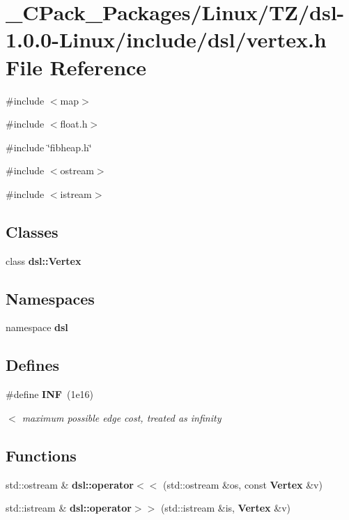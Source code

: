 \section{\_\-CPack\_\-Packages/Linux/TZ/dsl-\/1.0.0-\/Linux/include/dsl/vertex.h File Reference}
\label{__CPack__Packages_2Linux_2TZ_2dsl-1_80_80-Linux_2include_2dsl_2vertex_8h}
{\ttfamily \#include $<$map$>$}\par
{\ttfamily \#include $<$float.h$>$}\par
{\ttfamily \#include \char`\"{}fibheap.h\char`\"{}}\par
{\ttfamily \#include $<$ostream$>$}\par
{\ttfamily \#include $<$istream$>$}\par
\subsection*{Classes}
\begin{DoxyCompactItemize}
\item 
class {\bf dsl::Vertex}
\end{DoxyCompactItemize}
\subsection*{Namespaces}
\begin{DoxyCompactItemize}
\item 
namespace {\bf dsl}
\end{DoxyCompactItemize}
\subsection*{Defines}
\begin{DoxyCompactItemize}
\item 
\#define {\bf INF}~(1e16)
\begin{DoxyCompactList}\small\item\em $<$ maximum possible edge cost, treated as infinity \item\end{DoxyCompactList}\end{DoxyCompactItemize}
\subsection*{Functions}
\begin{DoxyCompactItemize}
\item 
std::ostream \& {\bf dsl::operator$<$$<$} (std::ostream \&os, const {\bf Vertex} \&v)
\item 
std::istream \& {\bf dsl::operator$>$$>$} (std::istream \&is, {\bf Vertex} \&v)
\end{DoxyCompactItemize}


